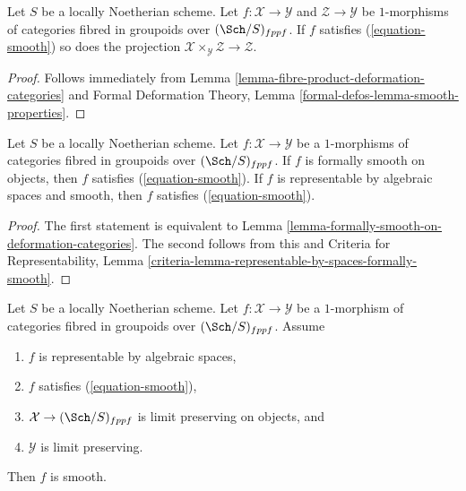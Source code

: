 \begin{lemma}
\label{lemma-base-change-smooth}
Let $S$ be a locally Noetherian scheme. Let $f : \mathcal{X} \to \mathcal{Y}$
and $\mathcal{Z} \to \mathcal{Y}$ be $1$-morphisms of
categories fibred in groupoids over $(\Sch/S)_{fppf}$. If $f$
satisfies (\ref{equation-smooth}) so does the projection
$\mathcal{X} \times_\mathcal{Y} \mathcal{Z} \to \mathcal{Z}$.
\end{lemma}

\begin{proof}
Follows immediately from
Lemma \ref{lemma-fibre-product-deformation-categories}
and
Formal Deformation Theory, Lemma
\ref{formal-defos-lemma-smooth-properties}.
\end{proof}

\begin{lemma}
\label{lemma-smooth-smooth}
Let $S$ be a locally Noetherian scheme. Let $f : \mathcal{X} \to \mathcal{Y}$
be a $1$-morphisms of categories fibred in groupoids over $(\Sch/S)_{fppf}$.
If $f$ is formally smooth on objects, then $f$ satisfies
(\ref{equation-smooth}). If $f$ is representable by algebraic spaces
and smooth, then $f$ satisfies (\ref{equation-smooth}).
\end{lemma}

\begin{proof}
The first statement is equivalent to
Lemma \ref{lemma-formally-smooth-on-deformation-categories}.
The second follows from this and
Criteria for Representability, Lemma
\ref{criteria-lemma-representable-by-spaces-formally-smooth}.
\end{proof}

\begin{lemma}
\label{lemma-implies-smooth}
Let $S$ be a locally Noetherian scheme. Let $f : \mathcal{X} \to \mathcal{Y}$
be a $1$-morphism of categories fibred in groupoids over $(\Sch/S)_{fppf}$.
Assume
\begin{enumerate}
\item $f$ is representable by algebraic spaces,
\item $f$ satisfies (\ref{equation-smooth}),
\item $\mathcal{X} \to (\Sch/S)_{fppf}$ is limit preserving on objects, and
\item $\mathcal{Y}$ is limit preserving.
\end{enumerate}
Then $f$ is smooth.
\end{lemma}

